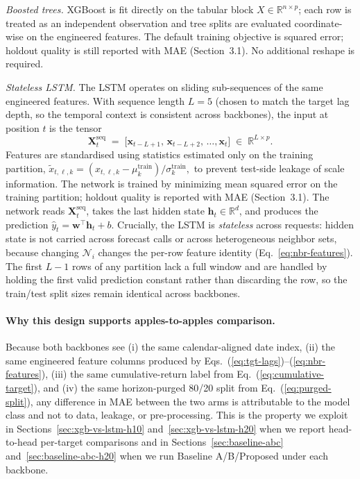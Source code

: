 \documentclass[12pt,a4paper,titlepage]{article}
\begin{document}
\emph{Boosted trees.} XGBoost is fit directly on the tabular block \(X\in\mathbb{R}^{n\times p}\); each row is treated as an independent observation and tree splits are evaluated coordinate-wise on the engineered features. The default training objective is squared error; holdout quality is still reported with MAE (Section~3.1). No additional reshape is required.

\emph{Stateless LSTM.} The LSTM operates on sliding sub-sequences of the same engineered features. With sequence length \(L=5\) (chosen to match the target lag depth, so the temporal context is consistent across backbones), the input at position \(t\) is the tensor
\begin{equation}
\mathbf{X}_t^{\text{seq}} \;=\;
\big[\mathbf{x}_{t-L+1},\,\mathbf{x}_{t-L+2},\,\ldots,\mathbf{x}_t\big]
\;\in\;\mathbb{R}^{L\times p}.
\label{eq:lstm-window}
\end{equation}
Features are standardised using statistics estimated only on the training partition,
\(
\tilde{x}_{t,\ell,k}=(x_{t,\ell,k}-\mu_k^{\text{train}})/\sigma_k^{\text{train}},
\)
to prevent test-side leakage of scale information. The network is trained by minimizing mean squared error on the training partition; holdout quality is reported with MAE (Section~3.1). The network reads \(\mathbf{X}_t^{\text{seq}}\), takes the last hidden state \(\mathbf{h}_t\in\mathbb{R}^{d}\), and produces the prediction \(\hat{y}_t = \mathbf{w}^\top\mathbf{h}_t + b\). Crucially, the LSTM is \emph{stateless} across requests: hidden state is not carried across forecast calls or across heterogeneous neighbor sets, because changing \(\mathcal{N}_i\) changes the per-row feature identity (Eq.~\ref{eq:nbr-features}). The first \(L-1\) rows of any partition lack a full window and are handled by holding the first valid prediction constant rather than discarding the row, so the train/test split sizes remain identical across backbones.

\paragraph{Why this design supports apples-to-apples comparison.}
Because both backbones see (i) the same calendar-aligned date index, (ii) the same engineered feature columns produced by Eqs.~(\ref{eq:tgt-lags})--(\ref{eq:nbr-features}), (iii) the same cumulative-return label from Eq.~(\ref{eq:cumulative-target}), and (iv) the same horizon-purged 80/20 split from Eq.~(\ref{eq:purged-split}), any difference in MAE between the two arms is attributable to the model class and not to data, leakage, or pre-processing. This is the property we exploit in Sections~\ref{sec:xgb-vs-lstm-h10} and~\ref{sec:xgb-vs-lstm-h20} when we report head-to-head per-target comparisons and in Sections~\ref{sec:baseline-abc} and~\ref{sec:baseline-abc-h20} when we run Baseline A/B/Proposed under each backbone.
\end{document}
